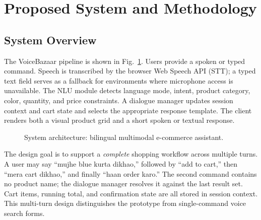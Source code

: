 \documentclass[conference]{IEEEtran}
\begin{document}
\section{Proposed System and Methodology}

\subsection{System Overview}

The VoiceBazaar pipeline is shown in Fig.~\ref{fig:architecture}.
Users provide a spoken or typed command. Speech is transcribed by the
browser Web Speech API (STT); a typed text field serves as a fallback
for environments where microphone access is unavailable. The NLU
module detects language mode, intent, product category, color,
quantity, and price constraints. A dialogue manager updates session
context and cart state and selects the appropriate response template.
The client renders both a visual product grid and a short spoken or
textual response.

\begin{figure}[t]
\centering
{}
\caption{System architecture: bilingual multimodal e-commerce assistant.}
\label{fig:architecture}
\end{figure}

The design goal is to support a \emph{complete} shopping workflow
across multiple turns. A user may say ``mujhe blue kurta dikhao,''
followed by ``add to cart,'' then ``mera cart dikhao,'' and finally
``haan order karo.'' The second command contains no product name; the
dialogue manager resolves it against the last result set. Cart items,
running total, and confirmation state are all stored in session
context. This multi-turn design distinguishes the prototype from
single-command voice search forms.
\end{document}
